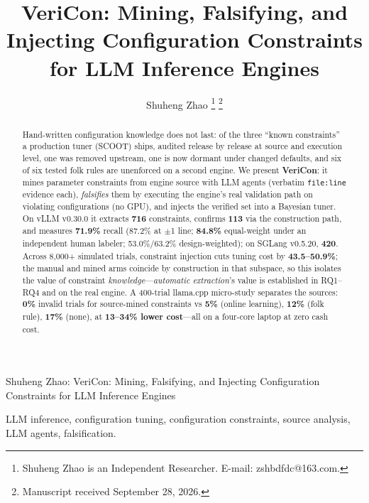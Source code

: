 \documentclass[journal]{IEEEtran}
\newcommand{\code}[1]{\texttt{#1}}
\begin{document}
\title{VeriCon: Mining, Falsifying, and Injecting Configuration Constraints for LLM Inference Engines}

\author{Shuheng Zhao%
\thanks{Shuheng Zhao is an Independent Researcher. E-mail: zshbdfdc@163.com.}%
\thanks{Manuscript received September 28, 2026.}}

%
{Shuheng Zhao: VeriCon: Mining, Falsifying, and Injecting Configuration Constraints for LLM Inference Engines}

\maketitle

\begin{abstract}
Hand-written configuration knowledge does not last: of the three ``known constraints'' a production tuner (SCOOT) ships, audited release by release at source and execution level, one was removed upstream, one is now dormant under changed defaults, and six of six tested folk rules are unenforced on a second engine. We present \textbf{VeriCon}: it mines parameter constraints from engine source with LLM agents (verbatim \code{file:line} evidence each), \emph{falsifies} them by executing the engine's real validation path on violating configurations (no GPU), and injects the verified set into a Bayesian tuner. On vLLM v0.30.0 it extracts \textbf{716} constraints, confirms \textbf{113} via the construction path, and measures \textbf{71.9\%} recall (87.2\% at $\pm$1 line; \textbf{84.8\%} equal-weight under an independent human labeler; 53.0\%/63.2\% design-weighted); on SGLang v0.5.20, \textbf{420}. Across 8{,}000+ simulated trials, constraint injection cuts tuning cost by \textbf{43.5--50.9\%}; the manual and mined arms coincide by construction in that subspace, so this isolates the value of constraint \emph{knowledge}---\emph{automatic extraction}'s value is established in RQ1--RQ4 and on the real engine. A 400-trial llama.cpp micro-study separates the sources: \textbf{0\%} invalid trials for source-mined constraints vs \textbf{5\%} (online learning), \textbf{12\%} (folk rule), \textbf{17\%} (none), at \textbf{13--34\% lower cost}---all on a four-core laptop at zero cash cost.
\end{abstract}

\begin{IEEEkeywords}
LLM inference, configuration tuning, configuration constraints, source analysis, LLM agents, falsification.
\end{IEEEkeywords}
\end{document}
